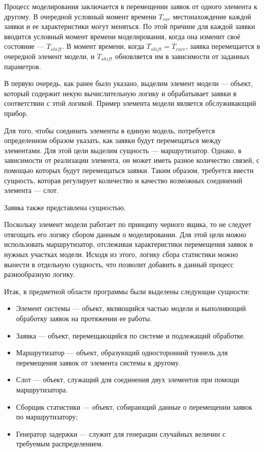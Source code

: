 Процесс моделирования заключается в перемещении заявок от одного элемента к другому. В очередной условный момент времени $T_{cur}$ местонахождение каждой заявки и ее характеристики могут меняться. По этой причине для каждой заявки вводится условный момент времени моделирования, когда она изменит своё состояние --- $T_{shift}$. В момент времени, когда $T_{shift} = T_{curr}$, заявка перемещается в очередной элемент модели, и  $T_{shift}$ обновляется им в зависимости от заданных параметров.

В первую очередь, как ранее было указано, выделим элемент модели --- объект, который содержит некую вычислительную логику и обрабатывает заявки в соответствии с этой логикой. Пример элемента модели является обслуживающий прибор.

Для того, чтобы соединить элементы в единую модель, потребуется определенном образом указать, как заявки будут перемещаться между элементами. Для этой цели выделим сущность --- маршрутизатор. Однако, в зависимости от реализации элемента, он может иметь разное количество связей, с помощью которых будут перемещаться заявки. Таким образом, требуется ввести сущность, которая регулирует количество и качество возможных соединений элемента --- слот.

Заявка также представлена сущностью.

Поскольку элемент модели работает по принципу черного ящика, то не следует отягощать его логику сбором данным о моделировании. Для этой цели можно использовать маршрутизатор, отслеживая характеристики перемещения заявок в нужных участках модели. Исходя из этого, логику сбора статистики можно вынести в отдельную сущность, что позволит добавить в данный процесс разнообразную логику.

Итак, в предметной области программы были выделены следующие сущности:
\begin{itemize}
	\item Элемент системы --- объект, являющийся частью модели и выполняющий обработку заявок на протяжении ее работы.
	\item Заявка --- объект, перемещающийся по системе и подлежащий обработке.
	\item Маршрутизатор --- объект, образующий односторонний туннель для перемещения заявок от элемента системы к другому.
	\item Слот --- объект, служащий для соединения двух элементов при помощи маршрутизатора.
	\item Сборщик статистики --- объект, собирающий данные о перемещении заявок по маршрутизатору;
	\item Генератор задержки --- служит для генерации случайных величин с требуемым распределением.
\end{itemize}

